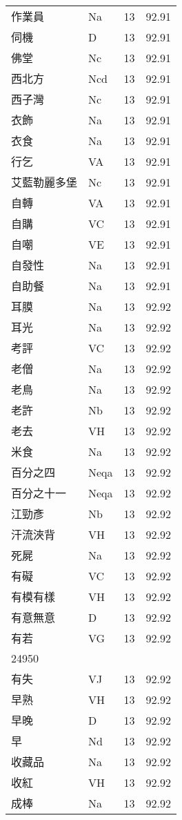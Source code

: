 \documentclass[twocolumn]{book}
\begin{document}
\begin{supertabular}{llrr}
作業員 & Na & 13 &  92.91\\
伺機 & D & 13 &  92.91\\
佛堂 & Nc & 13 &  92.91\\
西北方 & Ncd & 13 &  92.91\\
西子灣 & Nc & 13 &  92.91\\
衣飾 & Na & 13 &  92.91\\
衣食 & Na & 13 &  92.91\\
行乞 & VA & 13 &  92.91\\
艾藍勒麗多堡 & Nc & 13 &  92.91\\
自轉 & VA & 13 &  92.91\\
自購 & VC & 13 &  92.91\\
自嘲 & VE & 13 &  92.91\\
自發性 & Na & 13 &  92.91\\
自助餐 & Na & 13 &  92.91\\
耳膜 & Na & 13 &  92.92\\
耳光 & Na & 13 &  92.92\\
考評 & VC & 13 &  92.92\\
老僧 & Na & 13 &  92.92\\
老鳥 & Na & 13 &  92.92\\
老許 & Nb & 13 &  92.92\\
老去 & VH & 13 &  92.92\\
米食 & Na & 13 &  92.92\\
百分之四 & Neqa & 13 &  92.92\\
百分之十一 & Neqa & 13 &  92.92\\
江勁彥 & Nb & 13 &  92.92\\
汗流浹背 & VH & 13 &  92.92\\
死屍 & Na & 13 &  92.92\\
有礙 & VC & 13 &  92.92\\
有模有樣 & VH & 13 &  92.92\\
有意無意 & D & 13 &  92.92\\
有若 & VG & 13 &  92.92\\
24950\\
有失 & VJ & 13 &  92.92\\
早熟 & VH & 13 &  92.92\\
早晚 & D & 13 &  92.92\\
早 & Nd & 13 &  92.92\\
收藏品 & Na & 13 &  92.92\\
收紅 & VH & 13 &  92.92\\
成棒 & Na & 13 &  92.92\\

\end{supertabular}
\end{document}
